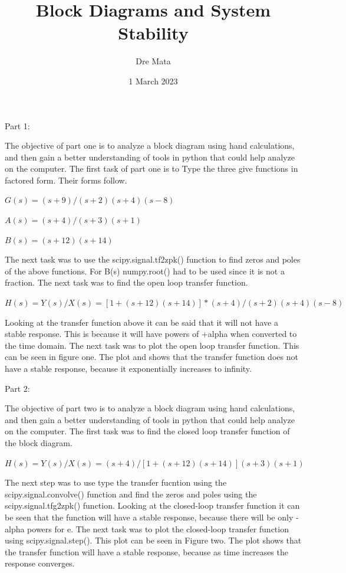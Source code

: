 \documentclass[nobib]{MSword}
\title{Block Diagrams and System Stability}
\author{Dre Mata}
\date{1 March 2023}
\begin{document}
\maketitle
\begin{center}
    Part 1:
\end{center}
The objective of part one is to analyze a block diagram using hand calculations, and then gain a better understanding of tools in python that could help analyze on the computer. The first task of part one is to Type the three give functions in factored form. Their forms follow.

\begin{center}
    $G(s) = (s+9)/(s+2)(s+4)(s-8)$
\end{center}

\begin{center}
    $A(s) = (s+4)/(s+3)(s+1)$
\end{center}

\begin{center}
    $B(s) = (s+12)(s+14)$
\end{center}
The next task was to use the scipy.signal.tf2zpk() function to find zeros and poles of the above functions. For B(s) numpy.root() had to be used since it is not a fraction. The next task was to find the open loop transfer function.

\begin{center}
    $H(s) = Y(s)/X(s) = [1 + (s+12)(s+14)]*(s+4)/(s+2)(s+4)(s-8)$
\end{center}
Looking at the transfer function above it can be said that it will not have a stable response. This is because it will have powers of +alpha when converted to the time domain. The next task was to plot the open loop transfer function. This can be seen in figure one. The plot and shows that the transfer function does not have a stable response, because it exponentially increases to infinity.

\begin{center}
    Part 2:
\end{center}
The objective of part two is to analyze a block diagram using hand calculations, and then gain a better understanding of tools in python that could help analyze on the computer. The first task was to find the closed loop transfer function of the block diagram.

\begin{center}
    $H(s) = Y(s)/X(s) = (s+4)/[1 + (s+12)(s+14)](s+3)(s+1)$
\end{center}
The next step was to use type the transfer fucntion using the scipy.signal.convolve() function and find the zeros and poles using the scipy.signal.tfg2zpk() function. Looking at the closed-loop transfer function it can be seen that the function will have a stable response, because there will be only -alpha powers for e. The next task was to plot the closed-loop transfer function using scipy.signal.step(). This plot can be seen in Figure two. The plot shows that the transfer function will have a stable response, because as time increases the response converges.
\end{document}
